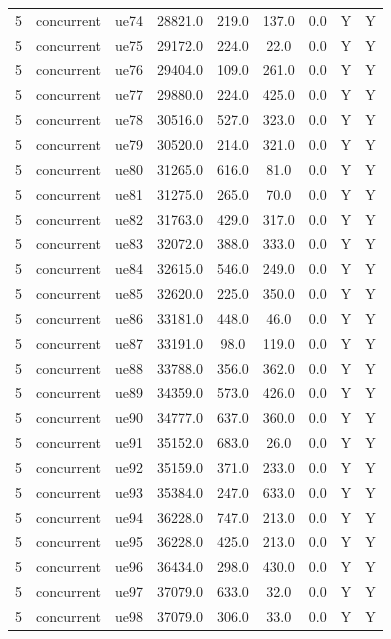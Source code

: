 \begin{table}[ht]
\begin{tabular}{|c|c|c|c|c|c|c|c|c|}
5 & concurrent & ue74 & 28821.0 & 219.0 & 137.0 & 0.0 & Y & Y \\
5 & concurrent & ue75 & 29172.0 & 224.0 & 22.0 & 0.0 & Y & Y \\
5 & concurrent & ue76 & 29404.0 & 109.0 & 261.0 & 0.0 & Y & Y \\
5 & concurrent & ue77 & 29880.0 & 224.0 & 425.0 & 0.0 & Y & Y \\
5 & concurrent & ue78 & 30516.0 & 527.0 & 323.0 & 0.0 & Y & Y \\
5 & concurrent & ue79 & 30520.0 & 214.0 & 321.0 & 0.0 & Y & Y \\
5 & concurrent & ue80 & 31265.0 & 616.0 & 81.0 & 0.0 & Y & Y \\
5 & concurrent & ue81 & 31275.0 & 265.0 & 70.0 & 0.0 & Y & Y \\
5 & concurrent & ue82 & 31763.0 & 429.0 & 317.0 & 0.0 & Y & Y \\
5 & concurrent & ue83 & 32072.0 & 388.0 & 333.0 & 0.0 & Y & Y \\
5 & concurrent & ue84 & 32615.0 & 546.0 & 249.0 & 0.0 & Y & Y \\
5 & concurrent & ue85 & 32620.0 & 225.0 & 350.0 & 0.0 & Y & Y \\
5 & concurrent & ue86 & 33181.0 & 448.0 & 46.0 & 0.0 & Y & Y \\
5 & concurrent & ue87 & 33191.0 & 98.0 & 119.0 & 0.0 & Y & Y \\
5 & concurrent & ue88 & 33788.0 & 356.0 & 362.0 & 0.0 & Y & Y \\
5 & concurrent & ue89 & 34359.0 & 573.0 & 426.0 & 0.0 & Y & Y \\
5 & concurrent & ue90 & 34777.0 & 637.0 & 360.0 & 0.0 & Y & Y \\
5 & concurrent & ue91 & 35152.0 & 683.0 & 26.0 & 0.0 & Y & Y \\
5 & concurrent & ue92 & 35159.0 & 371.0 & 233.0 & 0.0 & Y & Y \\
5 & concurrent & ue93 & 35384.0 & 247.0 & 633.0 & 0.0 & Y & Y \\
5 & concurrent & ue94 & 36228.0 & 747.0 & 213.0 & 0.0 & Y & Y \\
5 & concurrent & ue95 & 36228.0 & 425.0 & 213.0 & 0.0 & Y & Y \\
5 & concurrent & ue96 & 36434.0 & 298.0 & 430.0 & 0.0 & Y & Y \\
5 & concurrent & ue97 & 37079.0 & 633.0 & 32.0 & 0.0 & Y & Y \\
5 & concurrent & ue98 & 37079.0 & 306.0 & 33.0 & 0.0 & Y & Y \\

\end{tabular}
\end{table}
